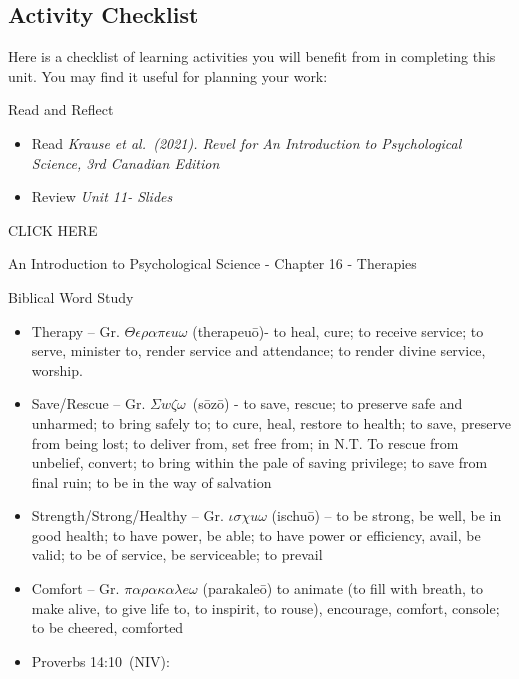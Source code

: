 \documentclass[
]{book}
\providecommand{\tightlist}{%
  \setlength{\itemsep}{0pt}\setlength{\parskip}{0pt}}
\begin{document}
\hypertarget{activity-checklist-10}{%
\subsection*{Activity Checklist}\label{activity-checklist-10}}

\begin{reflect}
Here is a checklist of learning activities you will benefit from in
completing this unit. You may find it useful for planning your work:

{Read and Reflect}

\begin{itemize}
\tightlist
\item
  Read \emph{Krause et al.~(2021). Revel for An Introduction to Psychological Science, 3rd Canadian Edition}\\
\item
  Review \emph{Unit 11- Slides}
\end{itemize}

CLICK HERE

An Introduction to Psychological Science - Chapter 16 - Therapies

Biblical Word Study

\begin{itemize}
\tightlist
\item
  Therapy -- Gr. \(\Theta \epsilon \rho \alpha \pi \epsilon u \omega\) (therapeuō)- to heal, cure; to receive service; to serve, minister to, render service and attendance; to render divine service, worship.\\
\item
  Save/Rescue -- Gr. \(\Sigma w \zeta \omega\)~(sōzō) - to save, rescue; to preserve safe and unharmed; to bring safely to; to cure, heal, restore to health; to save, preserve from being lost; to deliver from, set free from; in N.T. To rescue from unbelief, convert; to bring within the pale of saving privilege; to save from final ruin; to be in the way of salvation\\
\item
  Strength/Strong/Healthy -- Gr. \(\iota \sigma \chi u \omega\) (ischuō) -- to be strong, be well, be in good health; to have power, be able; to have power or efficiency, avail, be valid; to be of service, be serviceable; to prevail\\
\item
  Comfort -- Gr. \(\pi \alpha \rho \alpha \kappa \alpha \lambda e \omega\) (parakaleō) to animate (to fill with breath, to make alive, to give life to, to inspirit, to rouse), encourage, comfort, console; to be cheered, comforted\\
\item
  Proverbs 14:10~(NIV):


\end{itemize}
\end{reflect}
\end{document}
